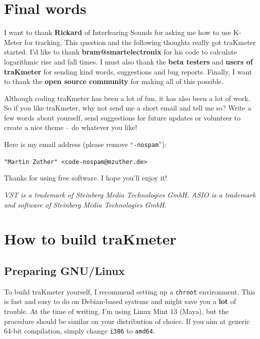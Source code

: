 \chapter{Final words}
\label{chap:final_words}

I want to thank \textbf{Rickard} of Interfearing Sounds for asking me
how to use K-Meter for tracking.  This question and the following
thoughts really got traKmeter started.  I'd like to thank
\textbf{bram@smartelectronix} for his code to calculate logarithmic
rise and fall times.  I must also thank the \textbf{beta testers} and
\textbf{users of traKmeter} for sending kind words, suggestions and
bug reports.  Finally, I want to thank the \textbf{open source
  community} for making all of this possible.

Although coding traKmeter has been a lot of fun, it has also been a
lot of work.  So if you like traKmeter, why not send me a short email
and tell me so?  Write a few words about yourself, send suggestions
for future updates or volunteer to create a nice theme -- do whatever
you like!

Here is my email address (please remove ``\texttt{-nospam}''):

\begin{center}
  \texttt{"Martin Zuther" <code-nospam@mzuther.de>}
\end{center}

Thanks for using free software.  I hope you'll enjoy it!

\emph{VST is a trademark of Steinberg Media Technologies GmbH.  ASIO
  is a trademark and software of Steinberg Media Technologies GmbH.}

\appendix

\chapter{How to build traKmeter}
\label{chap:build_trakmeter}

\section{Preparing GNU/Linux}

To build traKmeter yourself, I recommend setting up a \texttt{chroot}
environment.  This is fast and easy to do on Debian-based systems and
might save you a \textbf{lot} of trouble.  At the time of writing, I'm
using Linux Mint 13 (Maya), but the procedure should be similar on
your distribution of choice.  If you aim at generic \num{64}-bit
compilation, simply change \texttt{i386} to \texttt{amd64}.

